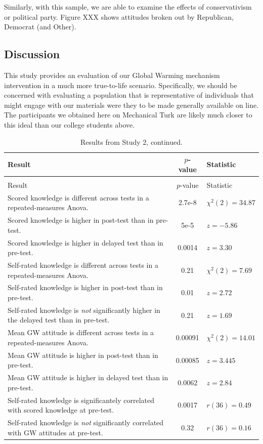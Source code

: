 Similarly, with this sample, we are able to examine the effects of
conservativism or political party. Figure XXX shows attitudes broken out by
Republican, Democrat (and Other).

\subsection{Discussion}

This study provides an evaluation of our Global Warming mechanism intervention
in a much more true-to-life scenario. Specifically, we should be concerned with
evaluating a population that is representative of individuals that might engage
with our materials were they to be made generally available on line. The
participants we obtained here on Mechanical Turk are likely much closer to this
ideal than our college students above.

\begin{longtabu}{X[2.5]S[table-parse-only]X[l]}

\caption{Summary of results from Study 2.\label{table:RPP-mech-results}}\\ 
\toprule
Result & {$p$-value} & Statistic \\ \midrule
\endfirsthead

\caption[]{Results from Study 2, continued.}\\
\toprule
Result & {$p$-value} & Statistic \\ \midrule
\endhead

\bottomrule
\endfoot

Scored knowledge is different across tests in a repeated-measures Anova. &
2.7e-8 & $\chi^2(2)=34.87$  \\
Scored knowledge is higher in post-test than in pre-test. & 
5e-5 & $z=-5.86$ \\
Scored knowledge is higher in delayed test than in pre-test. & 
0.0014 & $z=3.30$ \\
Self-rated knowledge is different across tests in a repeated-measures Anova. &
0.21 & $\chi^2(2)=7.69$ \\
Self-rated knowledge is higher in post-test than in pre-test. & 
0.01 & $z=2.72$ \\
Self-rated knowledge is \emph{not} significantly higher in the delayed test than in
pre-test. & 
0.21 & $z=1.69$ \\
Mean GW attitude is different across tests in a repeated-measures Anova. &
0.00091 & $\chi^2(2)=14.01$ \\
Mean GW attitude is higher in post-test than in pre-test. & 
0.00085 & $z=3.445$ \\
Mean GW attitude is higher in delayed test than in pre-test. & 
0.0062 & $z=2.84$ \\
Self-rated knowledge is significantely correlated with scored knowledge at
pre-test. & 
0.0017 & $r(36)=0.49$ \\
Self-rated knowledge is \emph{not} significantly correlated with GW attitudes at
pre-test. & 
0.32 & $r(36)=0.16$ \\

\end{longtabu}

